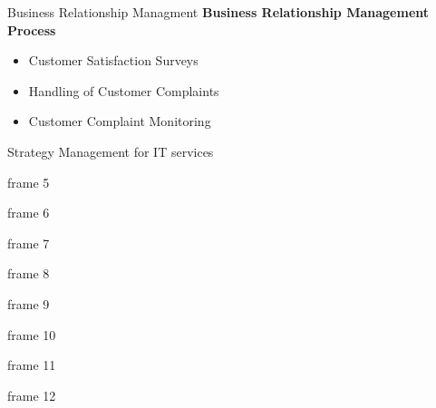 \documentclass[xcolor=x11names,compress]{beamer}
\renewcommand{\(}{\begin{columns}}
\renewcommand{\)}{\end{columns}}
\newcommand{\<}[1]{\begin{column}{#1}}
\renewcommand{\>}{\end{column}}
\begin{document}
\begin{frame}{Business Relationship Managment}
\textbf{Business Relationship Management Process}
\begin{itemize}
	\item Customer Satisfaction Surveys
	\item Handling of Customer Complaints	
	\item Customer Complaint Monitoring		
\end{itemize}
\end{frame}
\begin{frame}{Strategy Management for IT services}

\end{frame}
\begin{frame}{frame 5}

\end{frame}
\begin{frame}{frame 6}

\end{frame}
\begin{frame}{frame 7}

\end{frame}
\begin{frame}{frame 8}

\end{frame}
\begin{frame}{frame 9}

\end{frame}
\begin{frame}{frame 10}

\end{frame}
\begin{frame}{frame 11}

\end{frame}
\begin{frame}{frame 12}

\end{frame}
\end{document}
